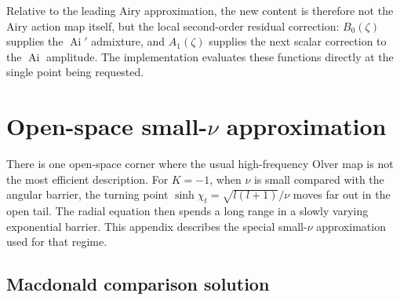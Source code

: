 \documentclass[11pt,a4paper]{article}
\newcommand{\Ai}{\operatorname{Ai}}
\begin{document}
Relative to the leading Airy approximation, the new content is therefore not
the Airy action map itself, but the local second-order residual correction:
\(B_0(\zeta)\) supplies the \(\Ai'\) admixture, and \(A_1(\zeta)\) supplies the
next scalar correction to the \(\Ai\) amplitude.  The implementation evaluates these functions directly at the single point
being requested.

\section{Open-space small-\texorpdfstring{\(\nu\)}{nu} approximation}
\label{app:smallnu-open}

There is one open-space corner where the usual high-frequency Olver map is not
the most efficient description.  For \(K=-1\), when \(\nu\) is small compared
with the angular barrier, the turning point
\(\sinh\chi_t= \sqrt{l(l+1)}/\nu\) moves far out in the open tail.  The
radial equation then spends a long range in a slowly varying exponential
barrier.  This appendix describes the special small-\(\nu\) approximation used
for that regime.

\subsection{Macdonald comparison solution}
\end{document}
